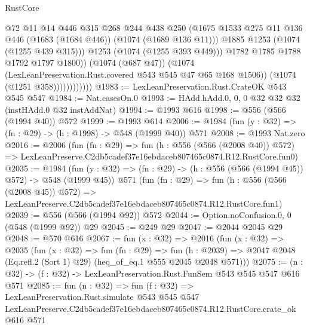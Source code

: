 \begin{lexlean}{RustCore}
\begin{coremodule}
                                @72
                                @11
                                @14
                                @446
                                @315
                                @268
                                @244
                                @438
                                @250
                                (@1675
                                  @1533
                                  @275
                                  @11
                                  @136
                                  @446
                                  (@1683 (@1684 @446))
                                  (@1074 (@1689 @136 @11)))
                                @1885
                                @1253
                                (@1074 (@1255 @439 @315)))
                              @1253
                              (@1074 (@1255 @393 @449)))
                            @1782
                            @1785
                            @1788
                            @1792
                            @1797
                            @1800))
                        (@1074 (@687 @47))
                        (@1074 (LexLeanPreservation.Rust.covered @543 @545 @47 @65 @168 @1506))
                        (@1074 (@1251 @358))))))))))))
@1983 := LexLeanPreservation.Rust.CrateOK @543 @545 @547
@1984 := Nat.casesOn.{0}
@1993 := HAdd.hAdd.{0, 0, 0} @32 @32 @32 (instHAdd.{0} @32 instAddNat)
@1994 := @1993 @616
@1998 := @556 (@566 (@1994 @40)) @572
@1999 := @1993 @614
@2006 := @1984 (fun (y : @32) => (fn : @29) -> (h : @1998) -> @548 (@1999 @40)) @571
@2008 := @1993 Nat.zero
@2016 := @2006
    (fun (fn : @29) =>
    fun (h : @556 (@566 (@2008 @40)) @572) =>
    LexLeanPreserve.C2db5cadef37e16ebdaceb807465c0874.R12.RustCore.fun0)
@2035 := @1984
    (fun (y : @32) => (fn : @29) -> (h : @556 (@566 (@1994 @45)) @572) -> @548 (@1999 @45))
    @571
    (fun (fn : @29) =>
    fun (h : @556 (@566 (@2008 @45)) @572) =>
    LexLeanPreserve.C2db5cadef37e16ebdaceb807465c0874.R12.RustCore.fun1)
@2039 := @556 (@566 (@1994 @92)) @572
@2044 := Option.noConfusion.{0, 0} (@548 (@1999 @92)) @29
@2045 := @249 @29
@2047 := @2044 @2045 @29
@2048 := @570 @616
@2067 := fun (x : @32) =>
  @2016
    (fun (x : @32) =>
    @2035
      (fun (x : @32) =>
      fun (fn : @29) =>
      fun (h : @2039) =>
      @2047 @2048 (Eq.refl.{2} (Sort 1) @29) (heq_of_eq.{1} @555 @2045 @2048 @571)))
@2075 := (n : @32) -> (f : @32) -> LexLeanPreservation.Rust.FunSem @543 @545 @547 @616 @571
@2085 := fun (n : @32) =>
  fun (f : @32) =>
  LexLeanPreservation.Rust.simulate
    @543
    @545
    @547
    LexLeanPreserve.C2db5cadef37e16ebdaceb807465c0874.R12.RustCore.crate_ok
    @616
    @571
\end{coremodule}
\end{lexlean}
